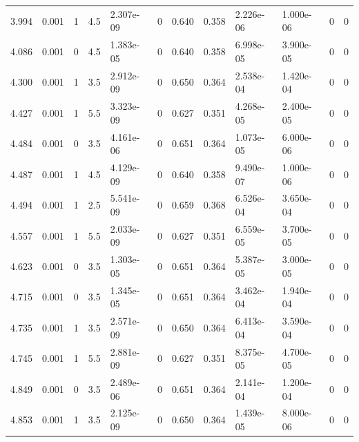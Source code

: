 \documentclass[preview]{standalone}
\begin{document}
{{\begin{tabular}{L{1.2cm}C{1.2cm} C{0.3cm}C{0.5cm} C{1.4cm}C{1.4cm} C{1.4cm}C{1.4cm} C{1.6cm}C{1.6cm} C{1.6cm}C{1.6cm}}
  3.994  &  0.001  & 1     & 4.5 &  2.307e-09  & 0  &  0.640&   0.358& 2.226e-06 & 1.000e-06   &  0 & 0  \\ 
  4.086  &  0.001  & 0     & 4.5 &  1.383e-05  & 0  &  0.640&   0.358& 6.998e-05 & 3.900e-05   &  0 & 0  \\ 
  4.300  &  0.001  & 1     & 3.5 &  2.912e-09  & 0  &  0.650&   0.364& 2.538e-04 & 1.420e-04   &  0 & 0  \\ 
  4.427  &  0.001  & 1     & 5.5 &  3.323e-09  & 0  &  0.627&   0.351& 4.268e-05 & 2.400e-05   &  0 & 0  \\ 
  4.484  &  0.001  & 0     & 3.5 &  4.161e-06  & 0  &  0.651&   0.364& 1.073e-05 & 6.000e-06   &  0 & 0  \\ 
  4.487  &  0.001  & 1     & 4.5 &  4.129e-09  & 0  &  0.640&   0.358& 9.490e-07 & 1.000e-06   &  0 & 0  \\ 
  4.494  &  0.001  & 1     & 2.5 &  5.541e-09  & 0  &  0.659&   0.368& 6.526e-04 & 3.650e-04   &  0 & 0  \\ 
  4.557  &  0.001  & 1     & 5.5 &  2.033e-09  & 0  &  0.627&   0.351& 6.559e-05 & 3.700e-05   &  0 & 0  \\ 
  4.623  &  0.001  & 0     & 3.5 &  1.303e-05  & 0  &  0.651&   0.364& 5.387e-05 & 3.000e-05   &  0 & 0  \\ 
  4.715  &  0.001  & 0     & 3.5 &  1.345e-05  & 0  &  0.651&   0.364& 3.462e-04 & 1.940e-04   &  0 & 0  \\ 
  4.735  &  0.001  & 1     & 3.5 &  2.571e-09  & 0  &  0.650&   0.364& 6.413e-04 & 3.590e-04   &  0 & 0  \\ 
  4.745  &  0.001  & 1     & 5.5 &  2.881e-09  & 0  &  0.627&   0.351& 8.375e-05 & 4.700e-05   &  0 & 0  \\ 
  4.849  &  0.001  & 0     & 3.5 &  2.489e-06  & 0  &  0.651&   0.364& 2.141e-04 & 1.200e-04   &  0 & 0  \\ 
  4.853  &  0.001  & 1     & 3.5 &  2.125e-09  & 0  &  0.650&   0.364& 1.439e-05 & 8.000e-06   &  0 & 0  \\ 
\hline 
\end{tabular} 

}}
\end{document}
